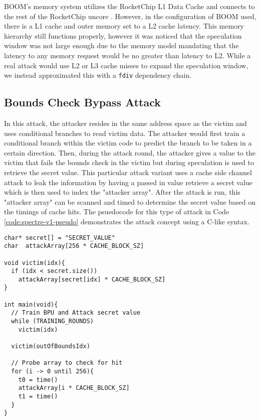 
BOOM's memory system utilizes the RocketChip L1 Data Cache and connects to the rest of the RocketChip
uncore \cite{b54}. However, in the configuration of BOOM used, there is a L1 cache and outer memory set to a L2 cache
latency. This memory hierarchy still functions properly, however it was noticed that the speculation window
was not large enough due to the memory model mandating that the latency to any memory request would be no greater than latency to L2.
While a real attack would use L2 or L3 cache misses to expand the speculation window, we instead approximated this with a {\tt fdiv} dependency chain.

\subsection{Bounds Check Bypass Attack} \label{Bounds Check Bypass Attack}

In this attack, the attacker resides in the same address space as the victim and uses
conditional branches to read victim data. The attacker would first train a conditional branch
within the victim code to predict the branch to be taken in a certain direction. Then,
during the attack round, the attacker
gives a value to the victim that fails the bounds check in the victim but during
speculation is used to retrieve the secret value. This particular attack variant
uses a cache side channel attack to leak the information by having a passed in value retrieve
a secret value which is then used to index the "attacker array". After the attack is run, this 
"attacker array" can be scanned and timed to determine the secret value based on the timings
of cache hits. The psuedocode for this type of attack in Code \ref{code:spectre-v1-pseudo}
demonstrates the attack concept using a C-like syntax.

\begin{lstlisting}[style=column-code, label={code:spectre-v1-pseudo}, caption=Psuedocode of Bounds Check Bypass Attack]
char* secret[] = "SECRET_VALUE"
char  attackArray[256 * CACHE_BLOCK_SZ]

void victim(idx){
  if (idx < secret.size())
    attackArray[secret[idx] * CACHE_BLOCK_SZ]
}

int main(void){
  // Train BPU and Attack secret value
  while (TRAINING_ROUNDS)
    victim(idx)

  victim(outOfBoundsIdx)

  // Probe array to check for hit
  for (i -> 0 until 256){
    t0 = time()
    attackArray[i * CACHE_BLOCK_SZ]
    t1 = time()
  }
}
\end{lstlisting}

